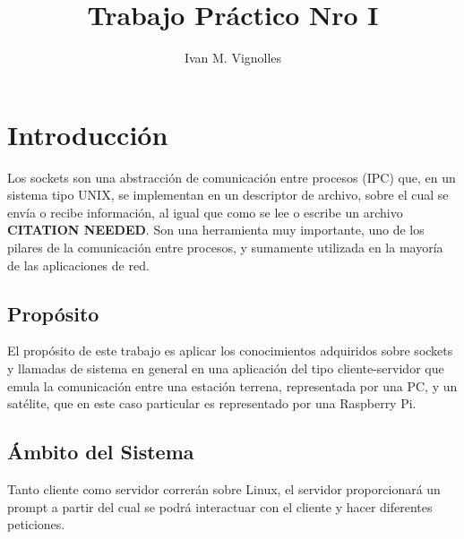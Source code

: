 \documentclass[11pt]{unc_so2}
\begin{document}
\title{Trabajo Práctico Nro I}
\author{Ivan M. Vignolles}

\maketitle[logo]


\nombrefecha
\tableofcontents*
\clearpage

\mainmatter

\section{Introducción}\label{sec:intr}
Los sockets son una abstracción de comunicación entre procesos (IPC) que, en un
sistema tipo UNIX, se implementan en un descriptor de archivo, sobre el cual se
envía o recibe información, al igual que como se lee o escribe un archivo
\textbf{CITATION NEEDED}. Son una herramienta muy importante, uno de los pilares
de la comunicación entre procesos, y sumamente utilizada en la mayoría de las
aplicaciones de red.

\subsection{Propósito}
El propósito de este trabajo es aplicar los conocimientos adquiridos sobre
sockets y llamadas de sistema en general en una aplicación del tipo cliente-servidor que
emula la comunicación entre una estación terrena, representada por una PC, y un
satélite, que en este caso particular es representado por una Raspberry Pi.

\subsection{Ámbito del Sistema}
Tanto cliente como servidor correrán sobre Linux, el servidor proporcionará un
prompt a partir del cual se podrá interactuar con el cliente y hacer diferentes peticiones.
\end{document}
